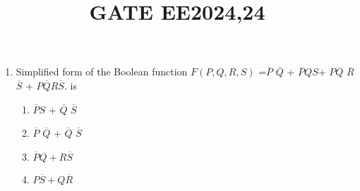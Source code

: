 \documentclass{article}
\title{GATE EE2024,24}
\begin{document}
\begin{enumerate}
\item Simplified form of the Boolean function
		$ F(P,Q,R,S)$ =$\overline{P}$ $\overline{Q}$ + $\overline{P}QS$+ $P\overline{Q}$ $\overline{R}$ $\overline{S}$ + $P\overline{Q}R\overline{S}.$
is		
\begin{enumerate}
\item $\overline{P}S$ + $\overline{Q}$ $\overline{S}$
\item $\overline{P}$ $\overline{Q}$ + $\overline{Q}$ $\overline{S}$
\item $\overline{P} Q + R\overline{S}$
\item $P\overline{S} + Q\overline{R}$
\end{enumerate}
\end{enumerate}
\end{document}
